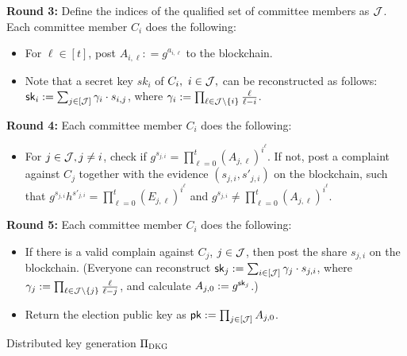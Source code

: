 {\textbf{Round 3:} Define the indices of the qualified set of committee members as $\mathcal{J}$. Each committee member $C_i$ does the following:
\begin{itemize}
\item For $\ell\in[t]$, post $A_{i,\ell} : = g^{a_{i,\ell}}$ to the blockchain.
\item Note that a secret key $sk_{i}$ of $C_i,~i\in\mathcal{J},$ can be reconstructed as follows: $\mathsf{sk}_{i} := \sum_{j\in[\mathcal{J}]} \gamma_{i} \cdot s_{i,j}$, where $\gamma_{i}:= \prod_{\ell\in \mathcal{J}\setminus \{i\} } \frac{\ell}{\ell-i}$.
\end{itemize}

\textbf{Round 4:} Each committee member $C_i$ does the following:
\begin{itemize}

\item For $j\in\mathcal{J}, j\neq i$, check if $g^{s_{j,i}}= \prod_{\ell=0}^{t} (A_{j,\ell})^{i^\ell}$. If not, post a complaint against $C_j$ together with the evidence $(s_{j,i},s'_{j,i})$ on the blockchain, such that $g^{s_{j,i}}h^{s'_{j,i}}= \prod_{\ell=0}^{t} (E_{j,\ell})^{i^\ell}$ and $g^{s_{j,i}}\neq  \prod_{\ell=0}^{t} (A_{j,\ell})^{i^\ell}$.
\end{itemize}

\textbf{Round 5:} Each committee member $C_i$ does the following:
\begin{itemize}
\item If there is a valid complain against $C_j$, $j\in\mathcal{J}$, then post the share $s_{j,i}$ on the blockchain. 
 (Everyone can reconstruct $\mathsf{sk}_j := \sum_{i\in[\mathcal{J}]} \gamma_{j} \cdot s_{j,i}$, where $\gamma_{j}:= \prod_{\ell\in \mathcal{J}\setminus \{j\} } \frac{\ell}{\ell-j}$, and calculate $A_{j,0}:= g^{\mathsf{sk}_j}$.)

\item Return the election public key as $\mathsf{pk} := \prod_{j\in[\mathcal{J}]}  A_{j,0}$.
\end{itemize}
	
}{Distributed key generation $\Pi_{\textsc{DKG}}$\label{fig:DKG}}

